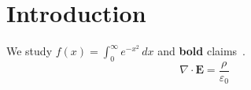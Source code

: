 \documentclass{article}
\begin{document}
\section{Introduction}
We study $f(x) = \int_0^\infty e^{-x^2}\,dx$ and \textbf{bold} claims~\cite{knuth}.
\begin{equation}
  \nabla \cdot \mathbf{E} = \frac{\rho}{\varepsilon_0}
\end{equation}
\end{document}
